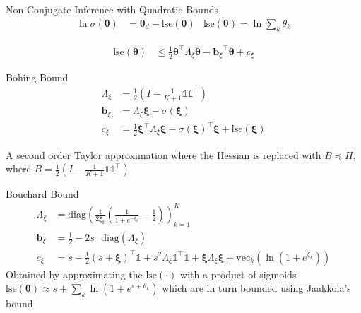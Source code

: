 \documentclass[xcolor=dvipsnames]{beamer}
\newcommand \halve[1] {
	\frac{#1}{2}
}
\newcommand \half {
    \halve{1}
}
\newcommand \T { ^\top }
\newcommand \vv[1] { \boldsymbol #1 }
\newcommand \diag[1] { \text{diag} \left( {#1} \right) }
\newcommand \Axi { { \Lambda_{\xi} } }
\newcommand \bxi { { \vv{b}_{\xi} } }
\newcommand \cxi { { c_{\xi} } }
\newcommand \thd[0]  { { \vv \theta_d } }
\newcommand \one  {{  \mathds{1} }}
\newcommand \lse { \text{lse} }
\begin{document}
\begin{frame}{Non-Conjugate Inference with Quadratic Bounds}
 {
    \begin{align*}
    \ln \sigma(\vv{\theta}) & = \thd - \lse(\vv{\theta}) & \lse(\vv{\theta}) = \ln \sum_k \theta_{k}
    \end{align*}
}

 {
    \begin{align*}
    \lse(\vv{\theta}) & \leq \half \vv{\theta}\T \Axi \vv{\theta} - \bxi\T\vv{\theta} + \cxi
    \end{align*}
}

 {
    Bohing Bound\cite{Bohning1988a}
    \begin{align*}
    \Axi & = \half \left( I - \frac{1}{K+1}\one \one\T \right) \\
    \bxi & = \Axi \vv{\xi} - \sigma(\vv{\xi})\\
    \cxi & = \half \vv{\xi}\T \Axi \vv{\xi} - \sigma(\vv{\xi})\T\vv{\xi} + \lse(\vv{\xi})
    \end{align*}
    
    A second order Taylor approximation where the Hessian is replaced with $B \preceq H$, where $B = \frac{1}{2}\left( I - \frac{1}{K+1}\one \one\T \right)$
}

 {
    Bouchard Bound\cite{Bouchard2007}
    \begin{align*}
    \Axi & = \diag{\frac{1}{2\xi_k} \left( \frac{1}{1 + e^{-\xi_k}} - \half\right) }_{k=1}^K  \\
    \bxi & = \half - 2 s \text{ }\diag{\Axi} \\
    \cxi & = s - \half (s + \vv{\xi})\T\one + s^2\Axi \one\T\one + \vv{\xi}\Axi\vv{\xi} + \text{vec}_k(\ln (1 + e^{\xi_k}))
    \end{align*}
Obtained by approximating the $\lse(\cdot)$ with a product of sigmoids $\lse(\vv{\theta}) \approx s + \sum_k \ln (1 + e^{s + \theta_k})$ which are in turn bounded using Jaakkola's bound\cite{Jaakkola1997}
}

\end{frame}
\end{document}
